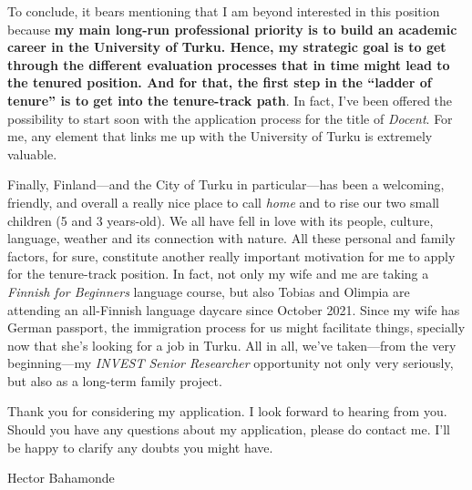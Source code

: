 \documentclass[10pt,stdletter,dateno,sigleft]{newlfm} %
\begin{document}
\begin{newlfm}
To conclude, it bears mentioning that I am beyond interested in this position because {\bf my main long-run professional priority is to build an academic career in the University of Turku.  Hence, my strategic goal is to get through the different evaluation processes that in time might lead to the tenured position. And for that, the first step in the ``ladder of tenure'' is to get into the tenure-track path}. In fact, I've been offered the possibility to start soon with the application process for the title of \emph{Docent}. For me, any element that links me up with the University of Turku is extremely valuable. 

Finally, Finland---and the City of Turku in particular---has been a welcoming, friendly, and overall a really nice place to call \emph{home} and to rise our two small children (5 and 3 years-old). We all have fell in love with its people, culture, language, weather and its connection with nature. All these personal and family factors, for sure, constitute another really important motivation for me to apply for the tenure-track position. In fact, not only my wife and me are taking a \emph{Finnish for Beginners} language course, but also Tobias and Olimpia are attending an all-Finnish language daycare since October 2021. Since my wife has German passport, the immigration process for us might facilitate things, specially now that she's looking for a job in Turku. All in all, we've taken---from the very beginning---my \emph{INVEST Senior Researcher} opportunity not only very seriously, but also as a long-term family project. 

Thank you for considering my application. I look forward to hearing from you. Should you have any questions about my application, please do contact me. I'll be happy to clarify any doubts you might have.




\vspace{3cm}

{\hspace{12cm}Hector Bahamonde}



\end{newlfm}
\end{document}
